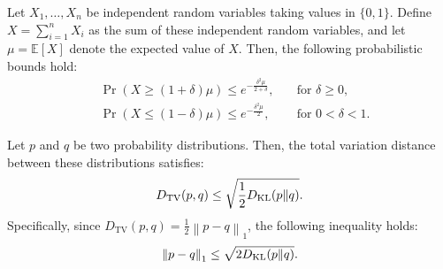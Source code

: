 \begin{lemma}
\label{lemma:chernoff}
Let \( X_1, \ldots, X_n \) be independent random variables taking values in \(\{0, 1\}\). Define \( X = \sum_{i=1}^n X_i \) as the sum of these independent random variables, and let \(\mu = \mathbb{E}[X]\) denote the expected value of \( X \). Then, the following probabilistic bounds hold:
\begin{equation*}
    \begin{aligned}
        & \Pr(X \geq (1 + \delta)\mu) \leq e^{-\frac{\delta^2\mu}{2 + \delta}}, \quad &\text{for } \delta \geq 0,\\
        & \Pr(X \leq (1 - \delta)\mu) \leq e^{-\frac{\delta^2\mu}{2}}, \quad &\text{for \ } 0 < \delta < 1.
    \end{aligned}
\end{equation*}
\end{lemma}

\begin{lemma}
\label{lemma:pinsker}
    Let $p$ and $q$ be two probability distributions. Then, the total variation distance between these distributions satisfies:
    $$D_\mathrm{TV}(p,q)\leq \sqrt{\frac{1}{2}D_{\mathrm{KL}}(p\|q)}.$$
    Specifically, since $D_\mathrm{TV}(p,q)=\frac{1}{2}\left\lVert p-q\right\rVert_1$, the following inequality holds:
    $$\left\lVert p-q\right\rVert_1\leq \sqrt{2D_{\mathrm{KL}}(p\|q)}.$$
\end{lemma}